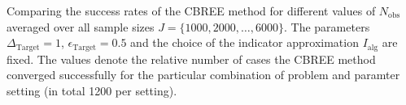 Comparing the success rates of the CBREE  method for different values of $N_{ \text{obs} }$  averaged over all sample sizes $J =   \{1000, 2000, \ldots, 6000\}$. The parameters $\Delta_{\text{Target}}=1$, $\epsilon_{\text{Target}} = 0.5$ and the choice of the indicator approximation $I_\text{alg}$ are fixed. The values denote the relative number of cases the CBREE method converged successfully for the particular combination of problem and paramter setting (in total 1200 per setting).